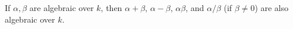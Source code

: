 If $\alpha,\beta$ are algebraic over $k$, then $\alpha+\beta$, $\alpha-\beta$, $\alpha\beta$, and $\alpha/\beta$ (if $\beta \neq 0$) are also algebraic over $k$.
